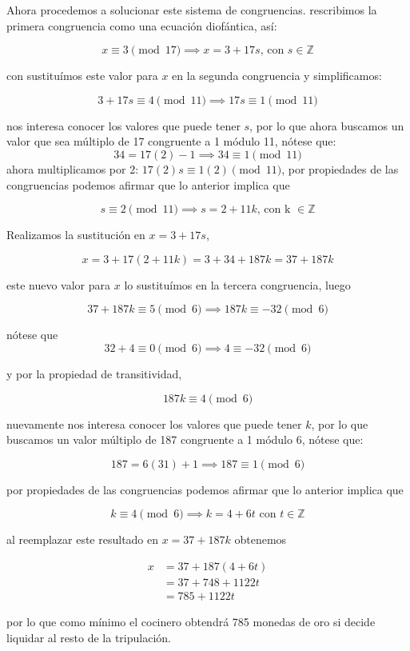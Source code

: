 \documentclass{article}
\begin{document}
Ahora procedemos a solucionar este sistema de congruencias. rescribimos la primera congruencia como una ecuación diofántica, así:

$$x \equiv 3 \pmod{17} \implies x = 3 + 17s \text{, con } s \in \mathbb{Z}$$

con sustituímos este valor para $x$ en la segunda congruencia y simplificamos:

$$3 + 17s \equiv 4 \pmod{11} \implies 17s \equiv 1 \pmod{11}$$

nos interesa conocer los valores que puede tener $s$, por lo que ahora buscamos un valor que sea múltiplo de 17 congruente a 1 módulo 11, nótese que:
$$34 = 17(2) - 1 \implies 34 \equiv 1 \pmod{11}$$
ahora multiplicamos por 2: $17(2)s \equiv 1(2) \pmod{11}$, por propiedades de las congruencias podemos afirmar que lo anterior implica que 

$$s \equiv 2 \pmod{11} \implies s = 2 + 11k \text{, con k } \in \mathbb{Z}$$

Realizamos la sustitución en $x = 3 + 17s$,

$$x = 3 + 17(2 + 11k) = 3 + 34 + 187k = 37 + 187k$$

este nuevo valor para $x$ lo sustituímos en la tercera congruencia, luego

$$37 + 187k \equiv 5 \pmod{6} \implies 187k \equiv -32 \pmod{6}$$

nótese que 
$$32 + 4 \equiv 0 \pmod{6} \implies 4 \equiv -32 \pmod{6}$$

y por la propiedad de transitividad,

$$187k \equiv 4 \pmod{6}$$

nuevamente nos interesa conocer los valores que puede tener $k$, por lo que buscamos un valor múltiplo de 187 congruente a 1 módulo 6, nótese que:

$$187 = 6(31) + 1 \implies 187 \equiv 1 \pmod{6}$$

por propiedades de las congruencias podemos afirmar que lo anterior implica que

$$k \equiv 4 \pmod{6} \implies k = 4 + 6t \text{ con } t \in \mathbb{Z}$$

al reemplazar este resultado en $x = 37 + 187k$ obtenemos

\begin{align*}
	x &= 37 + 187(4 + 6t)\\
	  &= 37 + 748 + 1122t\\
	  &= 785 + 1122t
\end{align*}

por lo que como mínimo el cocinero obtendrá 785 monedas de oro si decide liquidar al resto de la tripulación.
\end{document}

